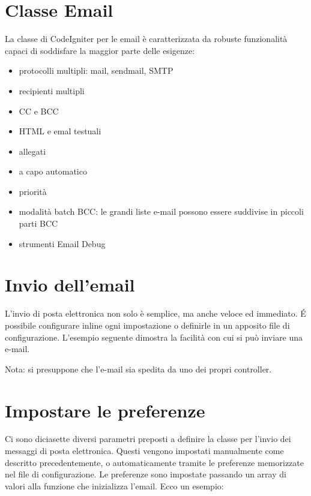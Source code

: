 \section{Classe Email}
\label{class:email}

La classe di CodeIgniter per le email è caratterizzata da robuste funzionalità capaci di soddisfare la maggior parte delle esigenze:

\begin{itemize}
\item protocolli multipli: mail, sendmail, SMTP
\item recipienti multipli
\item CC e BCC
\item HTML e emal testuali
\item allegati
\item a capo automatico
\item priorità
\item modalità batch BCC: le grandi liste e-mail possono essere suddivise in piccoli parti BCC
\item strumenti Email Debug
\end{itemize}

\section*{Invio dell'email}
L'invio di posta elettronica non solo è semplice, ma anche veloce ed immediato. \'E possibile configurare inline ogni impostazione o definirle in un apposito file di configurazione. L'esempio seguente dimostra la facilità con cui si può inviare una e-mail. 

Nota: si presuppone che l'e-mail sia spedita da uno dei propri controller.


\section*{Impostare le preferenze}
Ci sono diciasette diversi parametri preposti a definire la classe per l'invio dei messaggi di posta elettronica. Questi vengono impostati manualmente come descritto precedentemente, o automaticamente tramite le preferenze memorizzate nel file di configurazione. Le preferenze sono impostate passando un array di valori alla funzione che inizializza l'email. Ecco un esempio:


